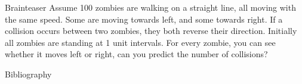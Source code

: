 \documentclass[aspectratio=169]{beamer}
\begin{document}
\begin{frame}{Brainteaser}
      Assume 100 zombies are walking on a straight line, all moving with the same speed. Some are moving towards left, and some towards right. If a collision occurs between two zombies, they both reverse their direction. Initially all zombies are standing at 1 unit intervals. For every zombie, you can see whether it moves left or right, can you predict the number of collisions?
\end{frame}

\begin{frame}[allowframebreaks]{Bibliography}
    \tiny
    
    
    
    \nocite{fermatwiki,dixonwiki,qswiki,dixonqsblog,factoringlecture,qfssimple}
    
\end{frame}

\end{document}
